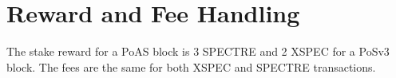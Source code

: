 \section{Reward and Fee Handling}
The stake reward for a PoAS block is 3 SPECTRE and 2 XSPEC for a PoSv3 block. The fees are the same for both XSPEC and SPECTRE transactions.